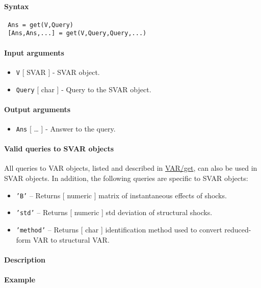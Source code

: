 


	\paragraph{Syntax}
 
 \begin{verbatim}
 Ans = get(V,Query)
 [Ans,Ans,...] = get(V,Query,Query,...)
 \end{verbatim}
 
 \paragraph{Input arguments}
 
 \begin{itemize}
 \item
   \texttt{V} {[} SVAR {]} - SVAR object.
 \item
   \texttt{Query} {[} char {]} - Query to the SVAR object.
 \end{itemize}
 
 \paragraph{Output arguments}
 
 \begin{itemize}
 \item
   \texttt{Ans} {[} \ldots{} {]} - Answer to the query.
 \end{itemize}
 
 \paragraph{Valid queries to SVAR objects}
 
 All queries to VAR objects, listed and described in \url{VAR/get}, can
 also be used in SVAR objects. In addition, the following queries are
 specific to SVAR objects:
 
 \begin{itemize}
 \item
   \texttt{'B'} -- Returns {[} numeric {]} matrix of instantaneous
   effects of shocks.
 \item
   \texttt{'std'} -- Returns {[} numeric {]} std deviation of structural
   shocks.
 \item
   \texttt{'method'} -- Returns {[} char {]} identification method used
   to convert reduced-form VAR to structural VAR.
 \end{itemize}
 
 \paragraph{Description}
 
 \paragraph{Example}


